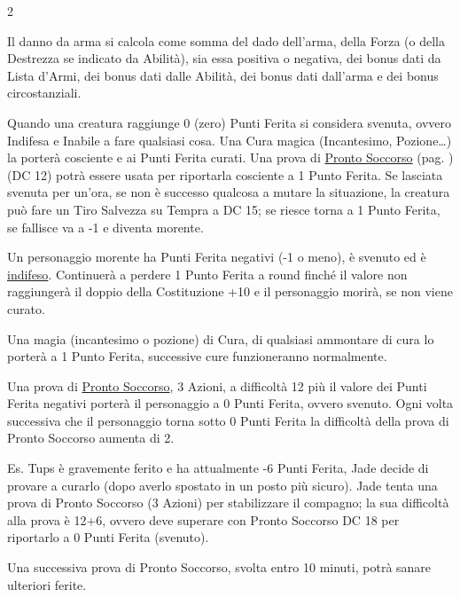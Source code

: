 \begin{multicols}{2}

Il danno da arma si calcola come somma del dado dell'arma, della Forza (o della Destrezza se indicato da Abilità), sia essa positiva o negativa, dei bonus dati da Lista d'Armi, dei bonus dati dalle Abilità, dei bonus dati dall'arma e dei bonus circostanziali.

Quando una creatura raggiunge 0 (zero) Punti Ferita si considera svenuta, ovvero Indifesa e Inabile a fare qualsiasi cosa. Una Cura magica (Incantesimo, Pozione…) la porterà cosciente e ai Punti Ferita curati. Una prova di \hyperlink{prontosoccorso}{Pronto Soccorso} (pag. \pageref{prontosoccorso}) (DC 12) potrà essere usata per riportarla cosciente a 1 Punto Ferita.
Se lasciata svenuta per un'ora, se non è successo qualcosa a mutare la situazione, la creatura può fare un Tiro Salvezza su Tempra a DC 15; se riesce torna a 1 Punto Ferita, se fallisce va a -1 e diventa morente.

Un personaggio morente ha Punti Ferita negativi (-1 o meno), è svenuto ed è \hyperlink{morente}{indifeso}. Continuerà a perdere 1 Punto Ferita a round finché il valore non raggiungerà il doppio della Costituzione +10 e il personaggio morirà, se non viene curato.

Una magia (incantesimo o pozione) di Cura, di qualsiasi ammontare di cura lo porterà a 1 Punto Ferita, successive cure funzioneranno normalmente.

Una prova di \hyperlink{prontosoccorso}{Pronto Soccorso}, 3 Azioni, a difficoltà 12 più il valore dei Punti Ferita negativi porterà il personaggio a 0 Punti Ferita, ovvero svenuto. Ogni volta successiva che il personaggio torna sotto 0 Punti Ferita la difficoltà della prova di Pronto Soccorso aumenta di 2.

\begin{giocatore}
Es. Tups è gravemente ferito e ha attualmente -6 Punti Ferita, Jade decide di provare a curarlo (dopo averlo spostato in un posto più sicuro). Jade tenta una prova di Pronto Soccorso (3 Azioni) per stabilizzare il compagno; la sua difficoltà alla prova è 12+6, ovvero deve superare con Pronto Soccorso DC 18 per riportarlo a 0 Punti Ferita (svenuto).

Una successiva prova di Pronto Soccorso, svolta entro 10 minuti, potrà sanare ulteriori ferite.
\end{giocatore}


\end{multicols}
